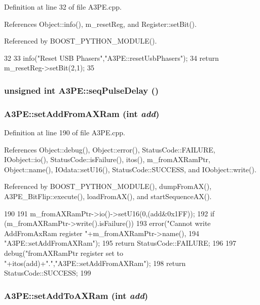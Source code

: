 Definition at line 32 of file A3PE.cpp.

References Object::info(), m\_\-resetReg, and Register::setBit().

Referenced by BOOST\_\-PYTHON\_\-MODULE().


\begin{DoxyCode}
32                                 {
33   info("Reset USB Phasers","A3PE::resetUsbPhasers");
34   return m_resetReg->setBit(2,1);
35 }
\end{DoxyCode}
\hypertarget{classA3PE_acce23c9abd4f434c8c5965351f5ceef0}{
\subsubsection[{seqPulseDelay}]{\setlength{\rightskip}{0pt plus 5cm}unsigned int A3PE::seqPulseDelay ()}}
\label{classA3PE_acce23c9abd4f434c8c5965351f5ceef0}
\hypertarget{classA3PE_a834fde5951d2c1bf6b41842520360fce}{
\subsubsection[{setAddFromAXRam}]{ A3PE::setAddFromAXRam (int {\em add})}}
\label{classA3PE_a834fde5951d2c1bf6b41842520360fce}


Definition at line 190 of file A3PE.cpp.

References Object::debug(), Object::error(), StatusCode::FAILURE, IOobject::io(), StatusCode::isFailure(), itos(), m\_\-fromAXRamPtr, Object::name(), IOdata::setU16(), StatusCode::SUCCESS, and IOobject::write().

Referenced by BOOST\_\-PYTHON\_\-MODULE(), dumpFromAX(), A3PE\_\-BitFlip::execute(), loadFromAX(), and startSequenceAX().


\begin{DoxyCode}
190                                        {
191   m_fromAXRamPtr->io()->setU16(0,(add&0x1FF));
192   if (m_fromAXRamPtr->write().isFailure()){
193       error("Cannot write AddFromAxRam register "+m_fromAXRamPtr->name(),
194           "A3PE::setAddFromAXRam");
195       return StatusCode::FAILURE;
196   }
197   debug("fromAXRamPtr register set to "+itos(add)+".","A3PE::setAddFromAXRam");
198   return StatusCode::SUCCESS;
199 }
\end{DoxyCode}
\hypertarget{classA3PE_a54fe4da570ea8833fe2c981de1085387}{
\subsubsection[{setAddToAXRam}]{ A3PE::setAddToAXRam (int {\em add})}}
\label{classA3PE_a54fe4da570ea8833fe2c981de1085387}



